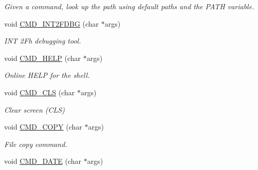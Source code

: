 \begin{DoxyCompactItemize}
\begin{DoxyCompactList}\small\item\em Given a command, look up the path using default paths and the P\-A\-T\-H variable. \end{DoxyCompactList}\item 
\hypertarget{classDOS__Shell_afbae9c2b8f7002fe029296b381bb7903}{void \hyperlink{classDOS__Shell_afbae9c2b8f7002fe029296b381bb7903}{C\-M\-D\-\_\-\-I\-N\-T2\-F\-D\-B\-G} (char $\ast$args)}\label{classDOS__Shell_afbae9c2b8f7002fe029296b381bb7903}

\begin{DoxyCompactList}\small\item\em I\-N\-T 2\-Fh debugging tool. \end{DoxyCompactList}\item 
\hypertarget{classDOS__Shell_a5bd467ce4762cd07c612b39bf788968d}{void \hyperlink{classDOS__Shell_a5bd467ce4762cd07c612b39bf788968d}{C\-M\-D\-\_\-\-H\-E\-L\-P} (char $\ast$args)}\label{classDOS__Shell_a5bd467ce4762cd07c612b39bf788968d}

\begin{DoxyCompactList}\small\item\em Online H\-E\-L\-P for the shell. \end{DoxyCompactList}\item 
\hypertarget{classDOS__Shell_a6564e9090602f43c480e818692ef233a}{void \hyperlink{classDOS__Shell_a6564e9090602f43c480e818692ef233a}{C\-M\-D\-\_\-\-C\-L\-S} (char $\ast$args)}\label{classDOS__Shell_a6564e9090602f43c480e818692ef233a}

\begin{DoxyCompactList}\small\item\em Clear screen (C\-L\-S) \end{DoxyCompactList}\item 
\hypertarget{classDOS__Shell_a8469d25012d305a92072cb7ea4c83bf5}{void \hyperlink{classDOS__Shell_a8469d25012d305a92072cb7ea4c83bf5}{C\-M\-D\-\_\-\-C\-O\-P\-Y} (char $\ast$args)}\label{classDOS__Shell_a8469d25012d305a92072cb7ea4c83bf5}

\begin{DoxyCompactList}\small\item\em File copy command. \end{DoxyCompactList}\item 
\hypertarget{classDOS__Shell_a71bce062b4315aef9f424b6bf10eac43}{void \hyperlink{classDOS__Shell_a71bce062b4315aef9f424b6bf10eac43}{C\-M\-D\-\_\-\-D\-A\-T\-E} (char $\ast$args)}\label{classDOS__Shell_a71bce062b4315aef9f424b6bf10eac43}


\end{DoxyCompactItemize}
